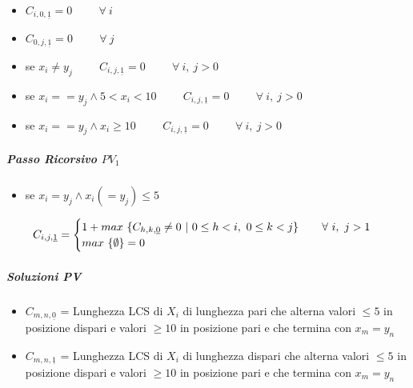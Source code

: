 \documentclass[12pt]{article}
\begin{document}
\begin{itemize}
    \item $C_{i,0,\underline{1}}=0 \hspace{1cm} \forall \ i$
    \item $C_{0,j,\underline{1}}=0 \hspace{1cm} \forall \ j$
    \item se $x_i \neq y_j \hspace{1cm} C_{i,j, \underline{1}}=0 \hspace{1cm} \forall \ i, \ j > 0$
    \item se $x_i == y_j \land 5<x_i<10 \hspace{1cm} C_{i,j,\underline{1}}=0 \hspace{1cm} \forall \ i, \ j > 0$
    \item se $x_i == y_j \land x_i \geq 10 \hspace{1cm} C_{i,j,\underline{1}}=0 \hspace{1cm} \forall \ i, \ j > 0$
\end{itemize}
\subparagraph{Passo Ricorsivo $PV_1$}
\begin{itemize}
    \item se $x_i=y_j \land x_i(=y_j)\leq 5$
\end{itemize}
\[
    C_{i, j, \underline{1}}=\begin{cases}
        1 + max \ \{C_{h, k, \underline{0}}\neq 0 \ | \ 0 \leq h<i, \ 0 \leq k<j\}$ \hspace{0.5cm} $\forall \ i, \ j>1 \\
        max \ \{\emptyset\} = 0
    \end{cases}
\]
\subparagraph{Soluzioni PV}
\begin{itemize}
    \item $C_{m, n, \underline{0}}$ = Lunghezza LCS di $X_i$ di lunghezza pari che alterna valori $\leq 5$ in posizione dispari e valori $\geq 10$ in posizione pari e che termina con $x_m = y_n$
    \item $C_{m, n, \underline{1}}$ = Lunghezza LCS di $X_i$ di lunghezza dispari che alterna valori $\leq 5$ in posizione dispari e valori $\geq 10$ in posizione pari e che termina con $x_m = y_n$
\end{itemize}
\end{document}
